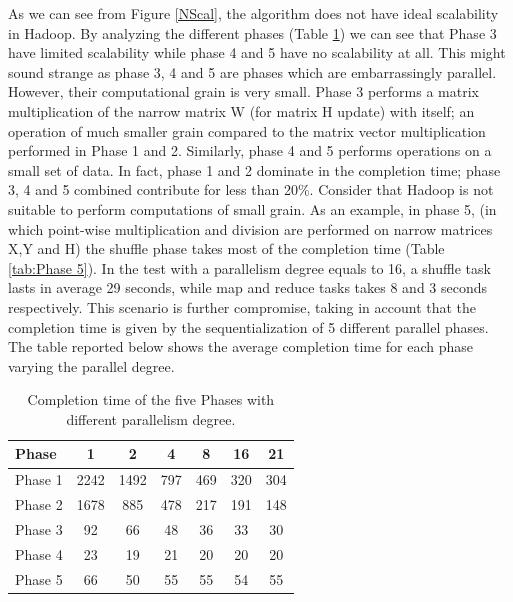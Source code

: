 As we can see from Figure \ref{NScal}, the algorithm does not have ideal scalability in Hadoop.
By analyzing the different phases (Table \ref{tab:differentPhases}) we can see that Phase 3 have limited scalability while phase 4 and 5 have no scalability at all.
This might sound strange as phase 3, 4 and 5 are phases which are embarrassingly parallel.
However, their computational grain is very small.
Phase 3 performs a matrix multiplication of the narrow matrix W (for matrix H update) with itself; an operation of much smaller grain compared to the matrix vector multiplication performed in Phase 1 and 2. 
Similarly, phase 4 and 5 performs operations on a small set of data.
In fact, phase 1 and 2 dominate in the completion time; phase 3, 4 and 5 combined contribute for less than 20\%.
Consider that Hadoop is not suitable to perform computations of small grain.
As an example, in phase 5, (in which point-wise multiplication and division are performed on narrow matrices X,Y and H)  the shuffle phase takes most of the completion time (Table \ref{tab:Phase 5}). 
In the test with a parallelism degree equals to 16, a shuffle task lasts in average 29 seconds, while map and reduce tasks takes 8 and 3 seconds respectively. 
This scenario is further compromise, taking in account that the completion time is given by the sequentialization of 5 different parallel phases. %
The table reported below shows the average completion time for each phase varying the parallel degree.

\begin{table}[h!]
\begin{center}
\begin{tabular}{ | l || c | c | c | c |  c | c | }

  \hline      
  Phase & 1 & 2 & 4 & 8 &16 & 21 \\
  \hline      
  Phase 1 & 2242 	& 1492 & 797 	& 469 	& 320 	& 304\\
  Phase 2 & 1678 	& 885 	& 478	& 217 	& 191 	& 148\\
  Phase 3 & 92 		& 66 	& 48 	& 36 	& 33 	& 30\\ 
  Phase 4 & 23 		& 19 	& 21 	& 20 	& 20 	& 20\\
  Phase 5 & 66 		& 50 	& 55 	& 55 	& 54 	& 55\\
  \hline  


\end{tabular} 
  \end{center}
    \label{tab:differentPhases}
\caption{Completion time of the five Phases with different parallelism degree.}
\end{table}

